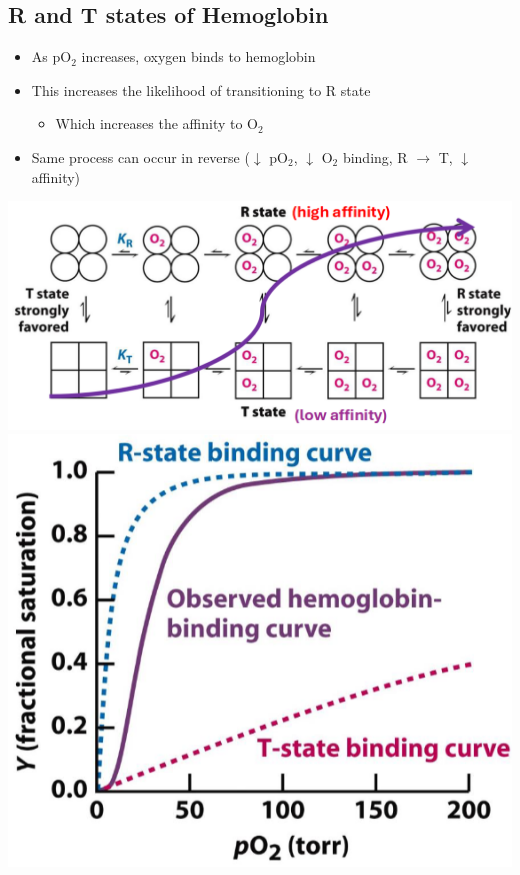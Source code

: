 \documentclass[10pt]{article}
\begin{document}
\subsection*{R and T states of Hemoglobin}
\begin{itemize}
    \item As pO$_2$ increases, oxygen binds to hemoglobin
    \item This increases the likelihood of transitioning to R state
    \begin{itemize}
        \item Which increases the affinity to O$_2$
    \end{itemize}
    \item Same process can occur in reverse ($\downarrow$ pO$_2$, $\downarrow$ O$_2$ binding, R $\rightarrow$ T, $\downarrow$ affinity)
\end{itemize}
\begin{center}
    \includegraphics*[width=\textwidth]{L3_13.png}\\
    \includegraphics*[scale=0.7]{L3_14.png}
\end{center}
\end{document}
